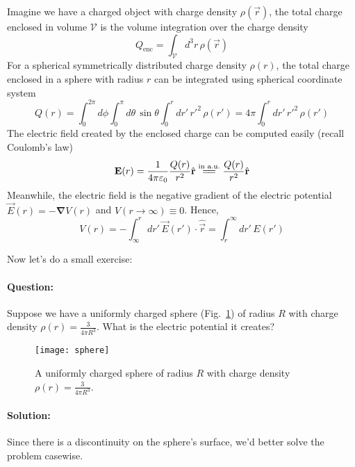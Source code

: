 Imagine we have a charged object with charge density $\rho(\vec{r})$,
the total charge enclosed in volume $\mathcal{V}$ is the volume integration
over the charge density
\begin{equation} \label{eq:charge}
Q_{\text{enc}} = \int_{\mathcal{V}} d^3r\,{\rho(\vec{r})}
\end{equation}
For a spherical symmetrically distributed charge density $\rho(r)$, the total
charge enclosed in a sphere with radius $r$ can be integrated using
spherical coordinate system
\begin{equation} \label{eq:charger}
Q(r) = \int_0^{2\pi}d\phi \int_0^{\pi}d\theta\,\sin{\theta} \int_0^r dr'\,r'^2\,\rho(r') = 4\pi \int_0^r dr'\,r'^2\,\rho(r')
\end{equation}
The electric field created by the enclosed charge can be computed easily
(recall Coulomb's law)
\begin{equation} \label{eq:eleField}
\vec{E}(r) = \frac{1}{4\pi\varepsilon_0} \frac{Q(r)}{r^2} \hat{\vec{r}} \stackrel{\text{in a.u.}}{=\joinrel=} \frac{Q(r)}{r^2} \hat{\vec{r}}
\end{equation}
Meanwhile, the electric field is the negative gradient of the electric potential
$\vec{E}(r) = -\boldsymbol{\nabla} V(r)$ and $V(r\rightarrow\infty)\equiv0$. Hence,
\begin{equation} \label{eq:elePot}
V(r) = - \int_{\infty}^{r} dr'\, \vec{E}(r') \cdot \hat{\vec{r}} = \int_{r}^{\infty}dr'\, E(r')
\end{equation}

Now let's do a small exercise:

\paragraph{Question:}
Suppose we have a uniformly charged sphere (Fig.~\ref{fig:sphere})
of radius $R$ with charge density $\rho(r) = \frac{3}{4\pi R^3}$.
What is the electric potential it creates?
\begin{figure}[h!]
\centering
  \texttt{[image: sphere]}
  \caption{A uniformly charged sphere of radius $R$ with charge density $\rho(r) = \frac{3}{4\pi R^3}$.}
  \label{fig:sphere}
\end{figure}

\vspace{5em}
\paragraph{Solution:}
Since there is a discontinuity on the sphere's surface, we'd better solve
the problem casewise.

